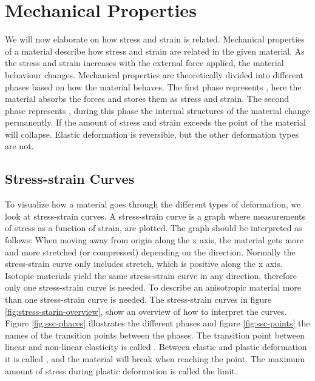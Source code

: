 \section{Mechanical Properties}
\label{mechanical-properties}
We will now elaborate on how stress and strain is related. Mechanical
properties of a material describe how stress and 
strain are related in the given material.
%
As the stress and strain increases with the external force applied,
the material behaviour changes.
Mechanical properties are theoretically divided into different
phases based on how the material behaves. The first phase represents  
, here the material absorbs the forces and
stores them as stress and strain. The second phase represents
, during this phase the internal structures
of the material change permanently. If the amount of stress and
strain exceeds the point of  the material will collapse.
Elastic deformation is reversible, but the other deformation types are not.



\subsection{Stress-strain Curves}
\label{sec:sscs}
To visualize how a material goes through the different
types of deformation, we look at stress-strain curves. A stress-strain
curve is a graph where measurements of stress as a function of
strain, are plotted. The graph should be interpreted as follows: When
moving away from origin along the x axis, the material gets more and
more stretched (or compressed) depending on the direction. Normally
the stress-strain curve only includes stretch, which is positive along
the x axis.
%
Isotopic materials yield the same stress-strain curve in
any direction, therefore only one stress-strain curve is needed. To
describe an anisotropic material more than one stress-strain curve is
needed.
%
The stress-strain curves in figure \vref{fig:stress-starin-overview},
show an overview of how to interpret the curves. Figure
\ref{fig:ssc-phaces} illustrates the different phases and figure
\ref{fig:ssc-points} the names of the transition points between the
phases. The transition point between linear and non-linear elasticity
is called . Between elastic and
plastic deformation it is called , and the
material will break when reaching the  point.
The maximum amount of stress during plastic deformation is called the
 limit.

